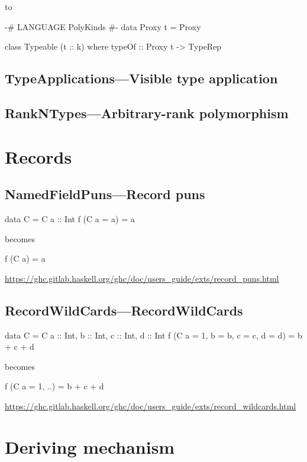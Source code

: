 \documentclass[openany, 12pt]{book}
\begin{document}
to
\begin{haskell}{}
{-# LANGUAGE PolyKinds #-}
data Proxy t = Proxy

class Typeable (t :: k) where
    typeOf :: Proxy t -> TypeRep
\end{haskell}

\setcounter{chapter}{16}
\chapter{TypeApplications---Visible type application}

\setcounter{chapter}{19}
\chapter{RankNTypes---Arbitrary-rank polymorphism}


\part{Records}

\setcounter{chapter}{6}
\chapter{NamedFieldPuns---Record puns}
\begin{haskell}{}
data C = C {a :: Int}
f (C {a = a}) = a
\end{haskell}
becomes

\begin{haskell}{}
f (C {a}) = a
\end{haskell}

\url{https://ghc.gitlab.haskell.org/ghc/doc/users_guide/exts/record_puns.html}

\chapter{RecordWildCards---RecordWildCards}
\begin{haskell}{}
data C = C {a :: Int, b :: Int, c :: Int, d :: Int}
f (C {a = 1, b = b, c = c, d = d}) = b + c + d
\end{haskell}
becomes

\begin{haskell}{}
f (C {a = 1, ..}) = b + c + d
\end{haskell}
\url{https://ghc.gitlab.haskell.org/ghc/doc/users_guide/exts/record_wildcards.html}


\part{Deriving mechanism}
\setcounter{chapter}{5}
\end{document}
